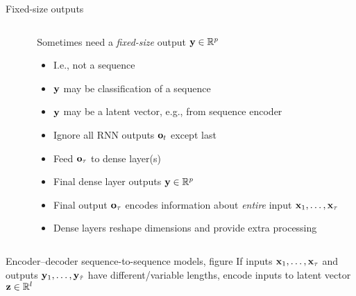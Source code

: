 \begin{frame}{Fixed-size outputs}
    \begin{columns}
        \begin{column}{0.37\textwidth}
        \end{column}
        \begin{column}{0.63\textwidth}
            Sometimes need a \emph{fixed-size} output $\mathbf{y} \in \mathbb{R}^p$
            \begin{itemize}
                \item<+-> I.e., not a sequence
                \item $\mathbf{y}$ may be classification of a sequence
                \item $\mathbf{y}$ may be a latent vector, e.g., from sequence encoder
            \end{itemize}
            \begin{itemize}[<.->]
                \item Ignore all RNN outputs $\mathbf{o}_t$ except last
                \item Feed $\mathbf{o}_\tau$ to dense layer(s)
                \item Final dense layer outputs $\mathbf{y} \in \mathbb{R}^p$
            \end{itemize}
            \begin{itemize}[<.->]
                \item Final output $\mathbf{o}_\tau$ encodes information about \emph{entire} input $\mathbf{x}_1, \ldots, \mathbf{x}_\tau$
                \item Dense layers reshape dimensions and provide extra processing
            \end{itemize}
        \end{column}
    \end{columns}
\end{frame}

\begin{frame}{Encoder--decoder sequence-to-sequence models, figure}
    If inputs $\mathbf{x}_1, \dots, \mathbf{x}_\tau$ and outputs $\mathbf{y}_1, \dots, \mathbf{y}_{\hat{\tau}}$ have different/variable lengths, \alert{encode} inputs to latent vector $\mathbf{z} \in \mathbb{R}^l$
    \vspace{1ex}

    
\end{frame}

